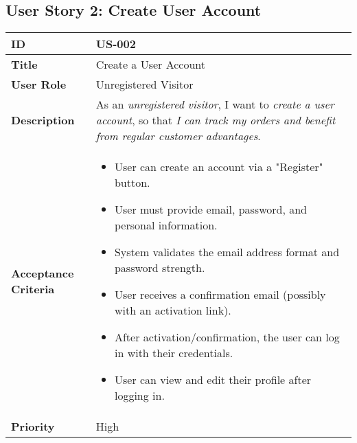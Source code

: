 \documentclass[a4paper,11pt]{article}
\begin{document}
\subsection{User Story 2: Create User Account}
\begin{tabularx}{\textwidth}{|l|X|}
\hline
\textbf{ID} & US-002 \\
\hline
\textbf{Title} & Create a User Account \\
\hline
\textbf{User Role} & Unregistered Visitor \\
\hline
\textbf{Description} & As an \textit{unregistered visitor}, I want to \textit{create a user account}, so that \textit{I can track my orders and benefit from regular customer advantages}. \\
\hline
\textbf{Acceptance Criteria} &
\begin{itemize}[noitemsep, topsep=0pt]
    \item User can create an account via a "Register" button.
    \item User must provide email, password, and personal information.
    \item System validates the email address format and password strength.
    \item User receives a confirmation email (possibly with an activation link).
    \item After activation/confirmation, the user can log in with their credentials.
    \item User can view and edit their profile after logging in.
\end{itemize} \\
\hline
\textbf{Priority} & High \\
\hline
\end{tabularx}
\end{document}
